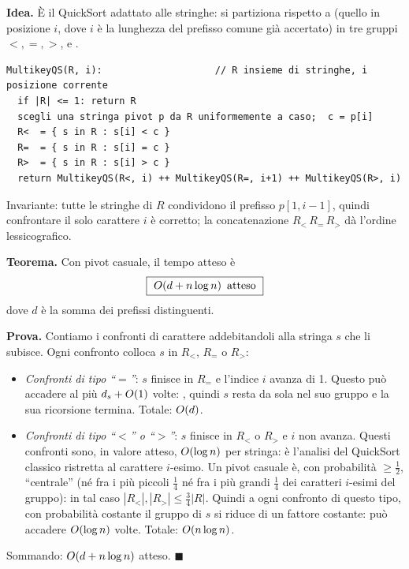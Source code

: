 \textbf{Idea.} \`E il QuickSort adattato alle stringhe: si partiziona rispetto a  (quello in posizione $i$, dove $i$ \`e la lunghezza del prefisso comune gi\`a
accertato) in tre gruppi $<,=,>$, e .

\begin{verbatim}
MultikeyQS(R, i):                    // R insieme di stringhe, i posizione corrente
  if |R| <= 1: return R
  scegli una stringa pivot p da R uniformemente a caso;  c = p[i]
  R<  = { s in R : s[i] < c }
  R=  = { s in R : s[i] = c }
  R>  = { s in R : s[i] > c }
  return MultikeyQS(R<, i) ++ MultikeyQS(R=, i+1) ++ MultikeyQS(R>, i)
\end{verbatim}

Invariante: tutte le stringhe di $R$ condividono il prefisso $p[1,i-1]$, quindi confrontare il
solo carattere $i$ \`e corretto; la concatenazione $R_<\,R_=\,R_>$ d\`a l'ordine lessicografico.

\textbf{Teorema.} Con pivot casuale, il tempo atteso \`e
\[
\boxed{\ \OO{d+n\log n}\ \text{atteso}\ }
\]
dove $d$ \`e la somma dei prefissi distinguenti.

\textbf{Prova.} Contiamo i confronti di carattere addebitandoli alla stringa $s$ che li subisce.
Ogni confronto colloca $s$ in $R_<$, $R_=$ o $R_>$:
\begin{itemize}[leftmargin=1.6em,itemsep=1pt]
\item \emph{Confronti di tipo ``$=$''}: $s$ finisce in $R_=$ e l'indice $i$ avanza di 1. Questo
pu\`o accadere al pi\`u $d_s+O\!\left(1\right)$ volte: , quindi $s$ resta da sola nel suo gruppo e la sua ricorsione termina. Totale: $O\!\left(d\right)$.
\item \emph{Confronti di tipo ``$<$'' o ``$>$''}: $s$ finisce in $R_<$ o $R_>$ e $i$ non avanza.
Questi confronti sono, in valore atteso, $O\!\left(\log n\right)$ per stringa: \`e l'analisi del QuickSort
classico ristretta al carattere $i$-esimo. Un pivot casuale \`e, con probabilit\`a $\ge\tfrac12$,
``centrale'' (n\'e fra i pi\`u piccoli $\tfrac14$ n\'e fra i pi\`u grandi $\tfrac14$ dei caratteri
$i$-esimi del gruppo): in tal caso $|R_<|,|R_>|\le\tfrac34|R|$. Quindi a ogni confronto di questo
tipo, con probabilit\`a costante il gruppo di $s$ si riduce di un fattore costante: pu\`o accadere
$O\!\left(\log n\right)$ volte. Totale: $O\!\left(n\log n\right)$.
\end{itemize}
Sommando: $O\!\left(d+n\log n\right)$ atteso. $\blacksquare$

